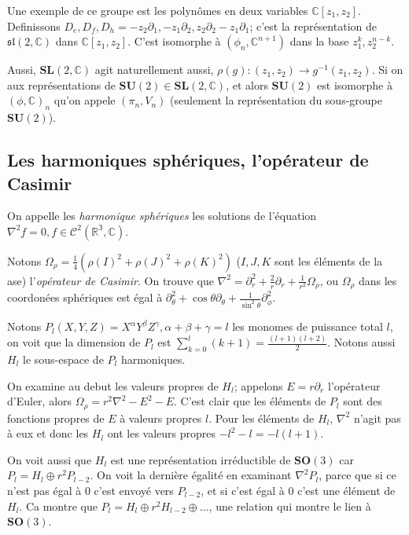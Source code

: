 \documentclass[10pt]{report}
\begin{document}
Une exemple de ce groupe est les polyn\^omes en deux variables $\mathbb{C}[z_1, z_2]$. Definissons $D_e, D_f, D_h = -z_2\partial_1, -z_1\partial_2, z_2\partial_2 - z_1\partial_1$; c'est la repr\'esentation de $\mathfrak{sl}(2, \mathbb{C})$ dans $\mathbb{C}[z_1, z_2]$. C'est isomorphe \`a $(\phi_n, \mathbb{C}^{n+1})$ dans la base $z_1^k, z_2^{n-k}$.

Aussi, $\mathbf{SL}(2,\mathbb{C})$ agit naturellement aussi, $\rho(g): (z_1, z_2) \to g^{-1}(z_1, z_2)$. Si on aux repr\'esentations de $\mathbf{SU}(2) \in \mathbf{SL}(2, \mathbb{C})$, et alors $\mathbf{SU}(2)$ est isomorphe \`a $(\phi, \mathbb{C})_n$ qu'on appele $(\pi_n, V_n)$ (seulement la repr\'esentation du sous-groupe $\mathbf{SU}(2)$). 

\subsection{Les harmoniques sph\'eriques, l'op\'erateur de Casimir}

On appelle les \emph{harmonique sph\'eriques} les solutions de l'\'equation $\nabla^2 f = 0, f \in \mathcal{C}^2(\mathbb{R^3},\mathbb{C})$.

Notons $\Omega_\rho = \frac{1}{4}\left( \rho(I)^2 + \rho(J)^2 + \rho(K)^2 \right)$ ($I,J,K$ sont les \'el\'ements de la ase) l'\emph{op\'erateur de Casimir}. On trouve que $\nabla^2 = \partial_r^2 + \frac{2}{r}\partial_r + \frac{1}{r^2}\Omega_\rho$, ou $\Omega_\rho$ dans les coordon\'ees sph\'eriques est \'egal \`a $\partial_\theta^2 + \cos\theta\partial_\theta + \frac{1}{\sin^2\theta} \partial_\phi^2$.

Notons $P_l(X,Y,Z) = X^\alpha Y^\beta Z^\gamma, \alpha + \beta + \gamma = l$ les monomes de puissance total $l$, on voit que la dimension de $P_l$ est $\sum\limits_{k=0}^{l}(k+1) = \frac{(l+1)(l+2)}{2}$. Notons aussi $H_l$ le sous-espace de $P_l$ harmoniques. 

On examine au debut les valeurs propres de $H_l$; appelons $E = r\partial_r$ l'op\'erateur d'Euler, alors $\Omega_\rho = r^2\nabla^2 - E^2 - E$. C'est clair que les \'el\'ements de $P_l$ sont des fonctions propres de $E$ \`a valeurs propres $l$. Pour les \'el\'ements de $H_l$, $\nabla^2$ n'agit pas \`a eux et donc les $H_l$ ont les valeurs propres $-l^2 - l = -l(l+1)$.

On voit aussi que $H_l$ est une repr\'esentation irr\'eductible de $\mathbf{SO}(3)$ car $P_l = H_l \oplus r^2 P_{l-2}$. On voit la derni\`ere \'egalit\'e en examinant $\nabla^2 P_l$, parce que si ce n'est pas \'egal \`a $0$ c'est envoy\'e vers $P_{l-2}$, et si c'est \'egal \`a $0$ c'est une \'el\'ement de $H_l$. Ca montre que $P_l = H_l \oplus r^2 H_{l-2} \oplus \dots$, une relation qui montre le lien \`a $\mathbf{SO}(3)$. 
\end{document}
